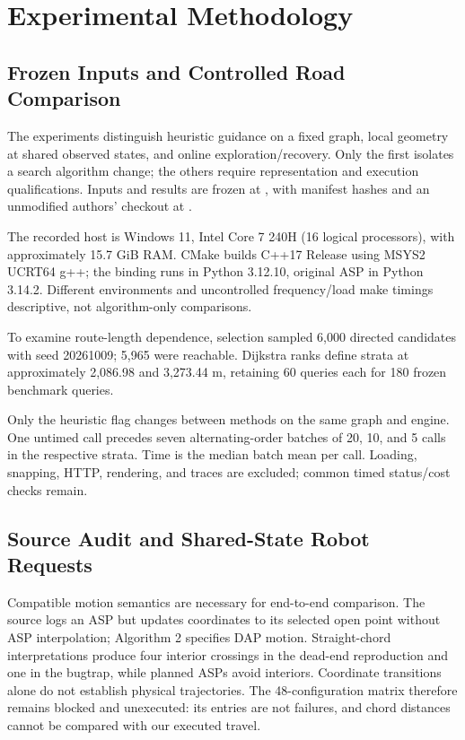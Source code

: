 \section{Experimental Methodology}
\subsection{Frozen Inputs and Controlled Road Comparison}
The experiments distinguish heuristic guidance on a fixed graph, local geometry at shared observed states, and online exploration/recovery. Only the first isolates a search algorithm change; the others require representation and execution qualifications. Inputs and results are frozen at , with manifest hashes and an unmodified authors' checkout at .

The recorded host is Windows 11, Intel Core 7 240H (16 logical processors), with approximately 15.7 GiB RAM. CMake builds C++17 Release using MSYS2 UCRT64 g++; the binding runs in Python 3.12.10, original ASP in Python 3.14.2. Different environments and uncontrolled frequency/load make timings descriptive, not algorithm-only comparisons.

To examine route-length dependence, selection sampled 6,000 directed candidates with seed 20261009; 5,965 were reachable. Dijkstra ranks define strata at approximately 2,086.98 and 3,273.44 m, retaining 60 queries each for 180 frozen benchmark queries.

Only the heuristic flag changes between methods on the same graph and engine. One untimed call precedes seven alternating-order batches of 20, 10, and 5 calls in the respective strata. Time is the median batch mean per call. Loading, snapping, HTTP, rendering, and traces are excluded; common timed status/cost checks remain.

\subsection{Source Audit and Shared-State Robot Requests}
Compatible motion semantics are necessary for end-to-end comparison. The source logs an ASP but updates coordinates to its selected open point without ASP interpolation; Algorithm 2 specifies DAP motion. Straight-chord interpretations produce four interior crossings in the dead-end reproduction and one in the bugtrap, while planned ASPs avoid interiors. Coordinate transitions alone do not establish physical trajectories. The 48-configuration matrix therefore remains blocked and unexecuted: its entries are not failures, and chord distances cannot be compared with our executed travel.

